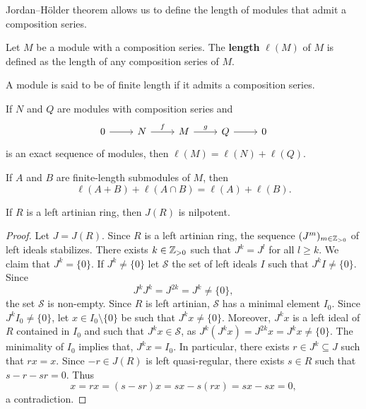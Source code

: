 Jordan--H\"older theorem allows us to define the 
length of modules that admit a composition series. 

\begin{definition}
    Let $M$ be a module with a composition series. 
    The \textbf{length} $\ell(M)$ of $M$ is defined as the length of any composition series of $M$. 
\end{definition}

A module is said to be of finite length if it admits a composition series. 

\begin{exercise}
	If $N$ and $Q$ are modules with composition series and  
	\[
	\begin{tikzcd}
		0 \arrow[r]
		& N \arrow{r}{f}
		& M \arrow{r}{g}
		& Q \arrow[r]
		& 0
	\end{tikzcd}
	\]
	is an exact sequence of modules, then $\ell(M)=\ell(N)+\ell(Q)$.
\end{exercise}


\begin{exercise}
	If $A$ and $B$ are finite-length submodules of $M$, then  
	\[
	\ell(A+B)+\ell(A\cap B)=\ell(A)+\ell(B).
	\]
\end{exercise}

\begin{theorem}
	\label{thm:Jnilpotente}
	If $R$ is a left artinian ring, then $J(R)$ is nilpotent. 
\end{theorem}

\begin{proof}
	Let $J=J(R)$. Since $R$ is a left artinian ring, the sequence 
	$(J^m)_{m\in\mathbb{Z}_{>0}}$ of left ideals stabilizes. There exists 
	$k\in\mathbb{Z}_{>0}$ such that $J^k=J^l$ for all $l\geq k$. We claim that $J^k=\{0\}$. If
	$J^k\ne\{0\}$ let $\mathcal{S}$ the set of left ideals 
	$I$ such that $J^kI\ne\{0\}$. Since 
	\[
	J^kJ^k=J^{2k}=J^k\ne\{0\},
	\]
	the set $\mathcal{S}$ is non-empty. 
	Since $R$ is left artinian, $\mathcal{S}$ has a minimal element $I_0$. Since $J^kI_0\ne\{0\}$, let $x\in
	I_0\setminus\{0\}$ be such that $J^kx\ne\{0\}$. Moreover, $J^kx$ is a left ideal of $R$ 
	contained in $I_0$ and such that $J^kx\in\mathcal{S}$, as 
	$J^k(J^kx)=J^{2k}x=J^kx\ne\{0\}$. The minimality of $I_0$ implies that, $J^kx=I_0$. In particular, 
	there exists $r\in J^k\subseteq J$ such that $rx=x$. Since $-r\in
	J(R)$ is left quasi-regular, there exists $s\in R$ such that $s-r-sr=0$.
	Thus 
	\[
		x=rx=(s-sr)x=sx-s(rx)=sx-sx=0,
	\]
	a contradiction.
\end{proof}

